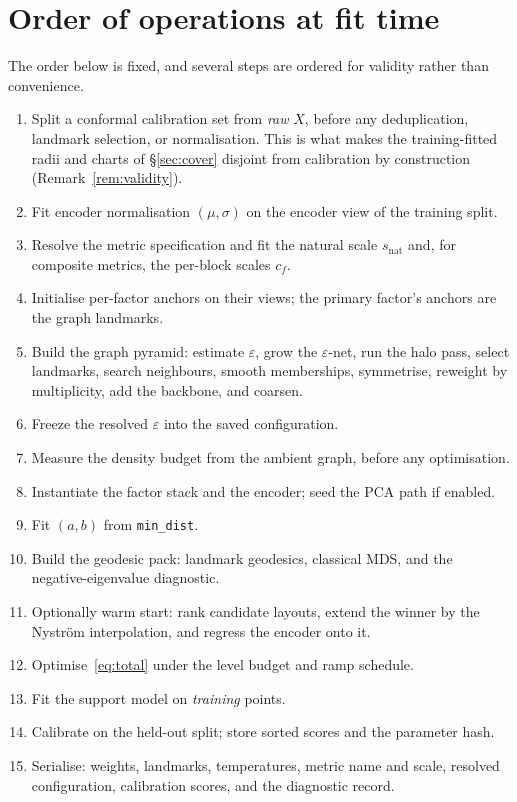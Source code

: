 \documentclass[12pt]{iopart}
\theoremstyle{definition}
\theoremstyle{plain}
\theoremstyle{remark}
\newcommand{\code}[1]{\texttt{#1}}
\begin{document}
\section{Order of operations at fit time}
\label{app:order}

The order below is fixed, and several steps are ordered for validity rather
than convenience.

\begin{enumerate}[leftmargin=*,nosep]
\item Split a conformal calibration set from \emph{raw} $X$, before any
  deduplication, landmark selection, or normalisation. This is what makes the
  training-fitted radii and charts of \S\ref{sec:cover} disjoint from
  calibration by construction (Remark~\ref{rem:validity}).
\item Fit encoder normalisation $(\mu,\sigma)$ on the encoder view of the
  training split.
\item Resolve the metric specification and fit the natural scale
  $s_{\mathrm{nat}}$ and, for composite metrics, the per-block scales $c_f$.
\item Initialise per-factor anchors on their views; the primary factor's
  anchors are the graph landmarks.
\item Build the graph pyramid: estimate $\varepsilon$, grow the
  $\varepsilon$-net, run the halo pass, select landmarks, search neighbours,
  smooth memberships, symmetrise, reweight by multiplicity, add the backbone,
  and coarsen.
\item Freeze the resolved $\varepsilon$ into the saved configuration.
\item Measure the density budget from the ambient graph, before any
  optimisation.
\item Instantiate the factor stack and the encoder; seed the PCA path if
  enabled.
\item Fit $(a,b)$ from \code{min\_dist}.
\item Build the geodesic pack: landmark geodesics, classical MDS, and the
  negative-eigenvalue diagnostic.
\item Optionally warm start: rank candidate layouts, extend the winner by the
  Nystr\"om interpolation, and regress the encoder onto it.
\item Optimise~\eqref{eq:total} under the level budget and ramp schedule.
\item Fit the support model on \emph{training} points.
\item Calibrate on the held-out split; store sorted scores and the parameter
  hash.
\item Serialise: weights, landmarks, temperatures, metric name and scale,
  resolved configuration, calibration scores, and the diagnostic record.
\end{enumerate}
\end{document}

